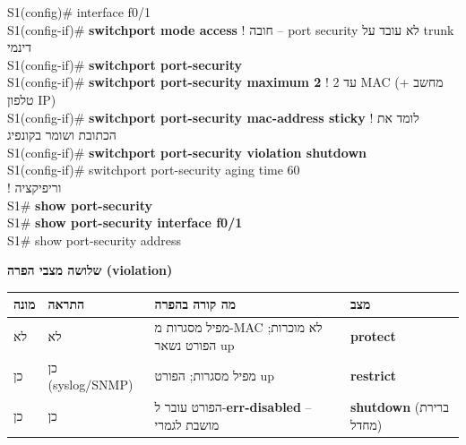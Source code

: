 \documentclass[11pt]{article}
\newcommand{\enLR}[1]{\textenglish{#1}}
\newcommand{\subheading}[1]{\vskip6pt{\bfseries\color{h3}#1\par}\vskip2pt}
\begin{document}
\begin{codebox}\begin{english}\codefont\footnotesize\color{cfg}\setlength{\parindent}{0pt}
S1(config)\# interface f0/1\\
S1(config-if)\# \textcolor{cbold}{\textbf{switchport mode access}}              \textcolor{ccom}{\texthebrew{! חובה – \enLR{port security} לא עובד על \enLR{trunk} דינמי}}\\
S1(config-if)\# \textcolor{cbold}{\textbf{switchport port-security}}\\
S1(config-if)\# \textcolor{cbold}{\textbf{switchport port-security maximum 2}}    \textcolor{ccom}{\texthebrew{! עד \enLR{2 MAC} (מחשב + טלפון \enLR{IP)}}}\\
S1(config-if)\# \textcolor{cbold}{\textbf{switchport port-security mac-address sticky}}  \textcolor{ccom}{\texthebrew{! לומד את הכתובת ושומר בקונפיג}}\\
S1(config-if)\# \textcolor{cbold}{\textbf{switchport port-security violation shutdown}}\\
S1(config-if)\# switchport port-security aging time 60\\
\textcolor{ccom}{\texthebrew{! וריפיקציה}}\\
S1\# \textcolor{cbold}{\textbf{show port-security}}\\
S1\# \textcolor{cbold}{\textbf{show port-security interface f0/1}}\\
S1\# show port-security address
\end{english}\end{codebox}

\subheading{שלושה מצבי הפרה \enLR{(violation)}}

\begin{xltabular}{\linewidth}{|>{\setRTL\raggedleft\arraybackslash}X|>{\setRTL\raggedleft\arraybackslash}X|>{\setRTL\raggedleft\arraybackslash}X|>{\setRTL\raggedleft\arraybackslash}X|}
\hline
{}\textbf{מונה} & \textbf{התראה} & \textbf{מה קורה בהפרה} & \textbf{מצב} \\
\hline
\endhead
לא & לא & מפיל מסגרות מ-\enLR{MAC} לא מוכרות; הפורט נשאר \enLR{up} & \textbf{\enLR{protect}} \\
\hline
כן & כן \enLR{(syslog/SNMP)} & מפיל מסגרות; הפורט \enLR{up} & \textbf{\enLR{restrict}} \\
\hline
כן & כן & הפורט עובר ל-\textbf{\enLR{err-disabled}} – מושבת לגמרי & \textbf{\enLR{shutdown}} (ברירת מחדל) \\
\hline
\end{xltabular}
\end{document}
